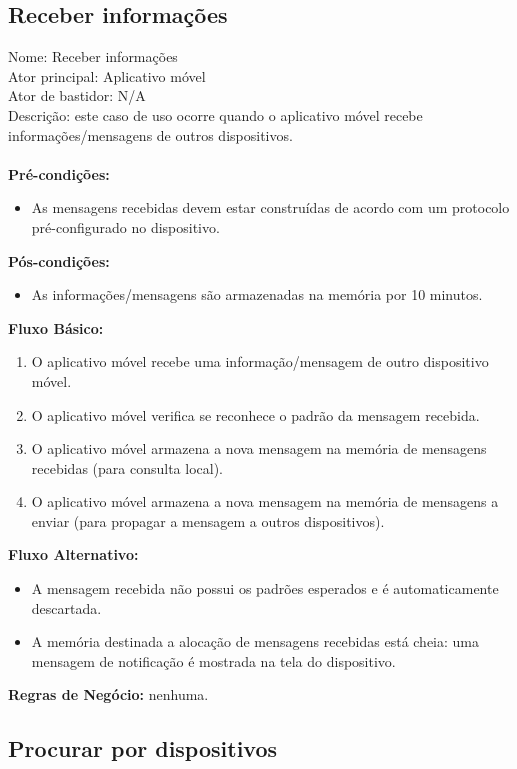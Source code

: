 \subsection{Receber informações }

\noindent Nome: Receber informações\\
Ator principal:	Aplicativo móvel\\
Ator de bastidor: N/A\\
Descrição: este caso de uso ocorre quando o aplicativo móvel recebe informações/mensagens de outros dispositivos.\\\\
\textbf{Pré-condições:}
	\begin{itemize}
		\item As mensagens recebidas devem estar construídas de acordo com um protocolo pré-configurado no dispositivo.
		\end{itemize}
\textbf{Pós-condições:}
	\begin{itemize}
		\item As informações/mensagens são armazenadas na memória por 10 minutos.
	\end{itemize}	
\textbf{Fluxo Básico:}
	\begin{enumerate}
		\item O aplicativo móvel recebe uma informação/mensagem de outro dispositivo móvel.
		\item O aplicativo móvel verifica se reconhece o padrão da mensagem recebida.
		\item O aplicativo móvel armazena a nova mensagem na memória de mensagens recebidas (para consulta local).
		\item O aplicativo móvel armazena a nova mensagem na memória de mensagens a enviar (para propagar a mensagem a outros dispositivos).
	\end{enumerate}	
\textbf{Fluxo Alternativo:}
	\begin{itemize}
		\item A mensagem recebida não possui os padrões esperados e é automaticamente descartada.
		\item A memória destinada a alocação de mensagens recebidas está cheia: uma mensagem de notificação é mostrada na tela do dispositivo.
	\end{itemize}
\textbf{Regras de Negócio:}	nenhuma.

\subsection{Procurar por dispositivos }

